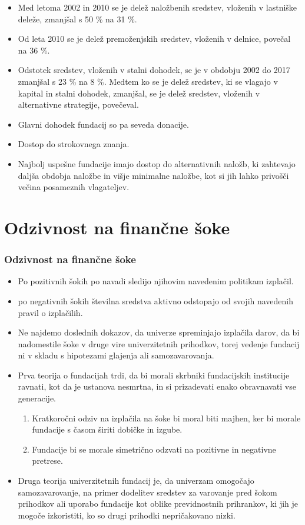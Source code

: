 \documentclass[10pt]{beamer}
\begin{document}
\begin{frame}
\begin{itemize}
\item Med letoma 2002 in 2010 se je delež naložbenih sredstev, vloženih v lastniške deleže, zmanjšal s 50 \% na 31 \%.
\item Od leta 2010 se je delež premoženjskih sredstev, vloženih v delnice, povečal na 36 \%.
\item Odstotek sredstev, vloženih v stalni dohodek, se je v obdobju 2002 do 2017 zmanjšal s 23 \% na 8 \%. Medtem ko se je delež sredstev, ki se vlagajo v kapital in stalni dohodek, zmanjšal, se je delež sredstev, vloženih v alternativne strategije, povečeval.
\item Glavni dohodek fundacij so pa seveda donacije.
\item Dostop do strokovnega znanja.
\item Najbolj uspešne fundacije imajo dostop do alternativnih naložb, ki zahtevajo daljša obdobja naložbe in višje minimalne naložbe, kot si jih lahko privošči večina posameznih vlagateljev.
\end{itemize}
\end{frame}

\section{Odzivnost na finančne šoke}
\begin{frame}
\frametitle{Odzivnost na finančne šoke}
\begin{itemize}
\item Po pozitivnih šokih po navadi sledijo njihovim navedenim politikam izplačil.
\item po negativnih šokih številna sredstva aktivno odstopajo od svojih navedenih pravil o izplačilih.
\item Ne najdemo doslednih dokazov, da univerze spreminjajo izplačila darov, da bi nadomestile šoke v druge vire univerzitetnih prihodkov, torej vedenje fundacij ni v skladu s hipotezami glajenja ali samozavarovanja.
\item Prva teorija o fundacijah trdi, da bi morali skrbniki fundacijskih institucije ravnati, kot da je ustanova nesmrtna, in si prizadevati enako obravnavati vse generacije.
\begin{enumerate}
\item Kratkoročni odziv na izplačila na šoke bi moral biti majhen, ker bi morale fundacije s časom širiti dobičke in izgube.
\item Fundacije bi se morale simetrično odzvati na pozitivne in negativne pretrese.
\end{enumerate}
\item Druga teorija univerzitetnih fundacij je, da univerzam omogočajo samozavarovanje, na primer dodelitev sredstev za varovanje pred šokom prihodkov ali uporabo fundacije kot oblike previdnostnih prihrankov, ki jih je mogoče izkoristiti, ko so drugi prihodki nepričakovano nizki.
\end{itemize}
\end{frame}
\end{document}
